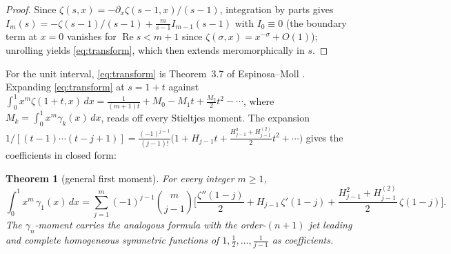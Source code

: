 \documentclass[11pt]{article}
\newtheorem{theorem}{Theorem}[section]
\theoremstyle{remark}
\begin{document}
\begin{proof}
Since $\zeta(s,x)=-\partial_x\zeta(s-1,x)/(s-1)$, integration by parts gives
$I_m(s)=-\zeta(s-1)/(s-1)+\tfrac{m}{s-1}I_{m-1}(s-1)$ with $I_0\equiv0$
(the boundary term at $x=0$ vanishes for $\operatorname{Re}s<m+1$ since
$\zeta(\sigma,x)=x^{-\sigma}+O(1)$); unrolling yields \eqref{eq:transform},
which then extends meromorphically in $s$.
\end{proof}

For the unit interval, \eqref{eq:transform} is Theorem~3.7 of
Espinosa--Moll \cite{EspinosaMoll1}. Expanding \eqref{eq:transform} at
$s=1+t$ against
$\int_0^1x^m\zeta(1+t,x)\,dx=\tfrac{1}{(m+1)t}+M_0-M_1t+\tfrac{M_2}{2}t^2-\cdots$,
where $M_k=\int_0^1x^m\gamma_k(x)\,dx$, reads off every Stieltjes moment.
The expansion
$1/[(t-1)\cdots(t-j+1)]=\tfrac{(-1)^{j-1}}{(j-1)!}\bigl(1+H_{j-1}t
+\tfrac{H_{j-1}^2+H_{j-1}^{(2)}}{2}t^2+\cdots\bigr)$
gives the coefficients in closed form:

\begin{theorem}[general first moment]\label{thm:moment}
For every integer $m\ge1$,
\[
\int_0^1 x^m\,\gamma_1(x)\,dx
=\sum_{j=1}^{m}(-1)^{j-1}\binom{m}{j-1}
\biggl[\frac{\zeta''(1-j)}{2}+H_{j-1}\,\zeta'(1-j)
+\frac{H_{j-1}^2+H_{j-1}^{(2)}}{2}\,\zeta(1-j)\biggr].
\]
The $\gamma_n$-moment carries the analogous formula with the order-$(n+1)$
jet leading and complete homogeneous symmetric functions of
$1,\tfrac12,\dots,\tfrac1{j-1}$ as coefficients.
\end{theorem}
\end{document}
